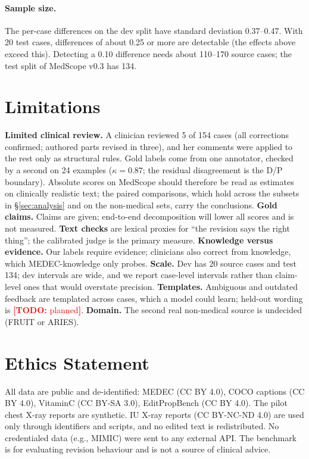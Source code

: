 \documentclass[11pt]{article}
\newcommand{\todo}[1]{\textcolor{red}{\textbf{[TODO:} #1\textbf{]}}}
\newcommand{\D}{\textsc{D}}
\newcommand{\Pp}{\textsc{P}}
\newcommand{\ms}{MedScope}
\begin{document}
\paragraph{Sample size.} The per-case differences on the dev split have standard deviation 0.37--0.47. With 20 test cases, differences of about 0.25 or more are detectable (the effects above exceed this). Detecting a 0.10 difference needs about 110--170 source cases; the test split of \ms{} v0.3 has 134.

\section{Limitations}
\label{sec:limits}
\textbf{Limited clinical review.} A clinician reviewed 5 of 154 cases (all corrections confirmed; authored parts revised in three), and her comments were applied to the rest only as structural rules. Gold labels come from one annotator, checked by a second on 24 examples ($\kappa=0.87$; the residual disagreement is the \D{}/\Pp{} boundary). Absolute scores on \ms{} should therefore be read as estimates on clinically realistic text; the paired comparisons, which hold across the subsets in \S\ref{sec:analysis} and on the non-medical sets, carry the conclusions. \textbf{Gold claims.} Claims are given; end-to-end decomposition will lower all scores and is not measured. \textbf{Text checks} are lexical proxies for ``the revision says the right thing''; the calibrated judge is the primary measure. \textbf{Knowledge versus evidence.} Our labels require evidence; clinicians also correct from knowledge, which MEDEC-knowledge only probes. \textbf{Scale.} Dev has 20 source cases and test 134; dev intervals are wide, and we report case-level intervals rather than claim-level ones that would overstate precision. \textbf{Templates.} Ambiguous and outdated feedback are templated across cases, which a model could learn; held-out wording is \todo{planned}. \textbf{Domain.} The second real non-medical source is undecided (FRUIT or ARIES).

\section*{Ethics Statement}
All data are public and de-identified: MEDEC (CC BY 4.0), COCO captions (CC BY 4.0), VitaminC (CC BY-SA 3.0), EditPropBench (CC BY 4.0). The pilot chest X-ray reports are synthetic. IU X-ray reports (CC BY-NC-ND 4.0) are used only through identifiers and scripts, and no edited text is redistributed. No credentialed data (e.g., MIMIC) were sent to any external API. The benchmark is for evaluating revision behaviour and is not a source of clinical advice.
\end{document}
